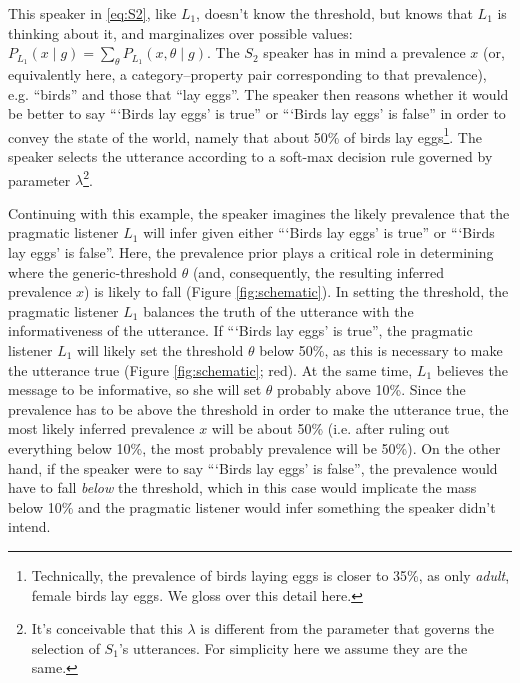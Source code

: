 \documentclass[10pt,letterpaper]{article}
\begin{document}
This speaker in \eqref{eq:S2}, like $L_{1}$, doesn't know the threshold, but knows that $L_{1}$ is thinking about it, and marginalizes over possible values: $ P_{L_{1}}(x \mid g) = \sum_{\theta} P_{L_{1}}(x , \theta \mid g) $. The $S_{2}$ speaker has in mind a prevalence $x$ (or, equivalently here, a category--property pair corresponding to that prevalence), e.g. ``birds'' and those that ``lay eggs''. The speaker then reasons whether it would be better to say ```Birds lay eggs' is true''  or ```Birds lay eggs' is false'' in order to convey the state of the world, namely that about 50\% of birds lay eggs\footnote{Technically, the prevalence of birds laying eggs is closer to 35\%, as only \emph{adult}, female birds lay eggs. We gloss over this detail here.}. The speaker selects the utterance according to a soft-max decision rule governed by parameter $\lambda$\footnote{It's conceivable that this $\lambda$ is different from the parameter that governs the selection of $S_{1}$'s utterances. For simplicity here we assume they are the same.}.

Continuing with this example, the speaker imagines the likely prevalence that the pragmatic listener $L_{1}$ will infer given either ```Birds lay eggs' is true''  or ```Birds lay eggs' is false''. Here, the prevalence prior plays a critical role in determining where the generic-threshold $\theta$ (and, consequently, the resulting inferred prevalence $x$) is likely to fall (Figure \ref{fig:schematic}). In setting the threshold, the pragmatic listener $L_{1}$ balances the truth of the utterance with the informativeness of the utterance. If ```Birds lay eggs' is true'', the pragmatic listener $L_{1}$ will likely set the threshold $\theta$ below 50\%, as this is necessary to make the utterance true (Figure \ref{fig:schematic}; red). At the same time, $L_{1}$ believes the message to be informative, so she will set $\theta$ probably above 10\%. Since the prevalence has to be above the threshold in order to make the utterance true, the most likely inferred prevalence $x$ will be about 50\% (i.e. after ruling out everything below 10\%, the most probably prevalence will be 50\%). On the other hand, if the speaker were to say ```Birds lay eggs' is false'', the prevalence would have to fall \emph{below} the threshold, which in this case would implicate the mass below 10\% and the pragmatic listener would infer something the speaker didn't intend. 
\end{document}
